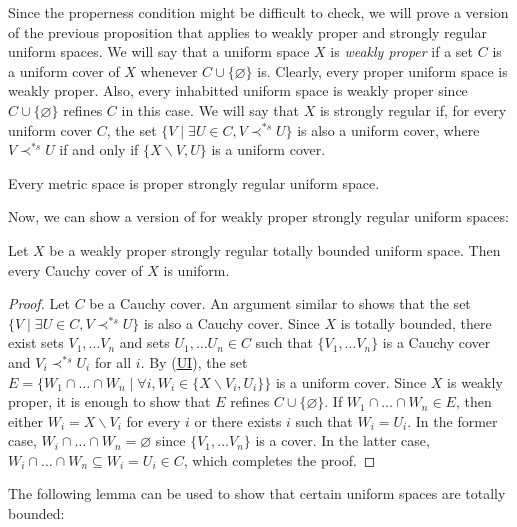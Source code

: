 \documentclass[reqno]{amsart}
\newcommand{\axref}[1]{(\hyperref[ax:#1]{#1})}
\theoremstyle{definition}
\theoremstyle{remark}
\numberwithin{figure}{section}
\newcommand{\rb}{\prec}
\begin{document}
Since the properness condition might be difficult to check, we will prove a version of the previous proposition that applies to weakly proper and strongly regular uniform spaces.
We will say that a uniform space $X$ is \emph{weakly proper} if a set $C$ is a uniform cover of $X$ whenever $C \cup \{ \varnothing \}$ is.
Clearly, every proper uniform space is weakly proper.
Also, every inhabitted uniform space is weakly proper since $C \cup \{ \varnothing \}$ refines $C$ in this case.
We will say that $X$ is strongly regular if, for every uniform cover $C$, the set $\{ V \mid \exists U \in C, V \rb^{*s} U \}$ is also a uniform cover,
where $V \rb^{*s} U$ if and only if $\{ X \backslash V, U \}$ is a uniform cover.

\begin{example}
Every metric space is proper strongly regular uniform space.
\end{example}

Now, we can show a version of  for weakly proper strongly regular uniform spaces:

\begin{prop}[tb-ws-cauchy]
Let $X$ be a weakly proper strongly regular totally bounded uniform space.
Then every Cauchy cover of $X$ is uniform.
\end{prop}
\begin{proof}
Let $C$ be a Cauchy cover.
An argument similar to  shows that the set $\{ V \mid \exists U \in C, V \rb^{*s} U \}$ is also a Cauchy cover.
Since $X$ is totally bounded, there exist sets $V_1, \ldots V_n$ and sets $U_1, \ldots U_n \in C$ such that $\{ V_1, \ldots V_n \}$ is a Cauchy cover and $V_i \rb^{*s} U_i$ for all $i$.
By \axref{UI}, the set $E = \{ W_1 \cap \ldots \cap W_n \mid \forall i, W_i \in \{ X \backslash V_i, U_i \} \}$ is a uniform cover.
Since $X$ is weakly proper, it is enough to show that $E$ refines $C \cup \{ \varnothing \}$.
If $W_1 \cap \ldots \cap W_n \in E$, then either $W_i = X \backslash V_i$ for every $i$ or there exists $i$ such that $W_i = U_i$.
In the former case, $W_i \cap \ldots \cap W_n = \varnothing$ since $\{ V_1, \ldots V_n \}$ is a cover.
In the latter case, $W_i \cap \ldots \cap W_n \subseteq W_i = U_i \in C$, which completes the proof.
\end{proof}

The following lemma can be used to show that certain uniform spaces are totally bounded:
\end{document}

